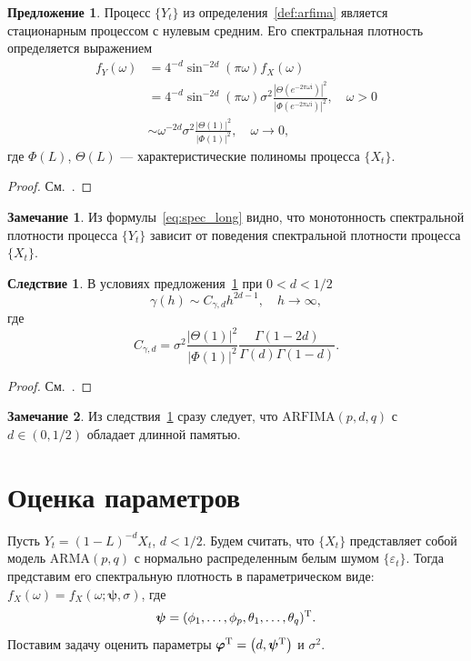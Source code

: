\documentclass[specialist,
substylefile = spbu_report.rtx,
subf,href,colorlinks=true, 12pt]{disser}
\theoremstyle{definition}
\newtheorem{remark}{Замечание}[chapter]
\newtheorem{proposition}{Предложение}[chapter]
\newtheorem{corollary}{Следствие}[chapter]
\newcommand{\im}{\mathrm{i}}
\begin{document}
\begin{proposition}\label{prop1}
	Процесс $\{Y_t\}$ из определения~\ref{def:arfima} является стационарным процессом с нулевым средним. Его спектральная плотность определяется выражением
	\begin{equation}\label{eq:spec_long}
		\begin{aligned}
			f_Y(\omega) & =4^{-d}\sin^{-2d}\left(\pi\omega\right)f_X(\omega)                                                                                                      \\
			            & =4^{-d}\sin^{-2d}\left(\pi\omega\right)\sigma^2\frac{\left|\Theta(e^{-2\pi \omega\im})\right|^2}{\left|\Phi(e^{-2\pi\omega\im})\right|^2},\quad\omega>0 \\
			            & \sim\omega^{-2d}\sigma^2\frac{|\Theta(1)|^2}{|\Phi(1)|^2},\quad \omega\to0,
		\end{aligned}
	\end{equation}
	где $\Phi(L)$, $\Theta(L)$ --- характеристические полиномы процесса $\{X_t\}$.
\end{proposition}
\begin{proof}
	См.~\cite[Proposition 6.1]{Hassler2018}.
\end{proof}
\begin{remark}
	Из формулы~\eqref{eq:spec_long} видно, что монотонность спектральной плотности процесса $\{Y_t\}$ зависит от поведения спектральной плотности процесса $\{X_t\}$.
\end{remark}
\begin{corollary}\label{corollary1}
	В условиях предложения~\ref{prop1} при $0<d<1/2$
	\[
		\gamma(h)\sim C_{\gamma,d}h^{2d-1},\quad h\to\infty,
	\]
	где
	\[
		C_{\gamma,d}=\sigma^2 \frac{|\Theta(1)|^2}{|\Phi(1)|^2} \frac{\Gamma(1-2d)}{\Gamma(d)\Gamma(1-d)}.
	\]
\end{corollary}
\begin{proof}
	См.~\cite[Corollary 6.1]{Hassler2018}.
\end{proof}
\begin{remark}
	Из следствия~\ref{corollary1} сразу следует, что $\mathrm{ARFIMA}(p, d, q)$ с $d\in(0, 1/2)$ обладает длинной памятью.
\end{remark}

\section{Оценка параметров}
Пусть $Y_t=(1-L)^{-d}X_t$, $d<1/2$. Будем считать, что $\{X_t\}$ представляет собой модель $\mathrm{ARMA}(p, q)$ с нормально распределенным белым шумом $\{\varepsilon_t\}$. Тогда представим его спектральную плотность в параметрическом виде: $f_X(\omega)=f_X(\omega; \bm\psi, \sigma)$, где
\[
	\bm\psi=(\phi_1,\ldots,\phi_p,\theta_1,\ldots,\theta_q)^{\mathrm{T}}.
\]
Поставим задачу оценить параметры $\bm\varphi^{\mathrm{T}}=\left(d, \bm\psi^{\mathrm{T}}\right)$ и $\sigma^2$.
\end{document}
